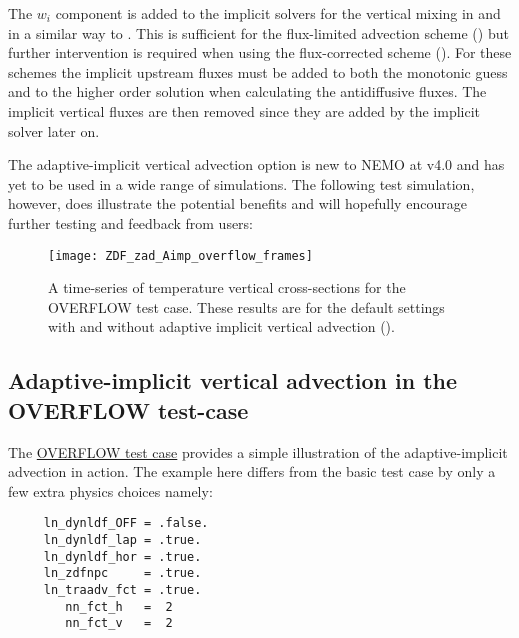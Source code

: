 \documentclass[../main/NEMO_manual]{subfiles}
\begin{document}
The $w_i$ component is added to the implicit solvers for the vertical mixing in
 and  in a similar way to \citep{shchepetkin_OM15}.  This is
sufficient for the flux-limited advection scheme () but further
intervention is required when using the flux-corrected scheme ().
For these schemes the implicit upstream fluxes must be added to both the monotonic guess
and to the higher order solution when calculating the antidiffusive fluxes. The implicit
vertical fluxes are then removed since they are added by the implicit solver later on.

The adaptive-implicit vertical advection option is new to NEMO at v4.0 and has yet to be
used in a wide range of simulations. The following test simulation, however, does illustrate
the potential benefits and will hopefully encourage further testing and feedback from users:

\begin{figure}[!t]
  \centering
  \texttt{[image: ZDF\_zad\_Aimp\_overflow\_frames]}
  \caption[OVERFLOW: time-series of temperature vertical cross-sections]{
    A time-series of temperature vertical cross-sections for the OVERFLOW test case.
    These results are for the default settings with  and
    without adaptive implicit vertical advection ().}
  \label{fig:ZDF_zad_Aimp_overflow_frames}
\end{figure}

\subsection{Adaptive-implicit vertical advection in the OVERFLOW test-case}

The \href{https://forge.ipsl.jussieu.fr/nemo/chrome/site/doc/NEMO/guide/html/test\_cases.html\#overflow}{OVERFLOW test case}
provides a simple illustration of the adaptive-implicit advection in action. The example here differs from the basic test case
by only a few extra physics choices namely:

\begin{verbatim}
     ln_dynldf_OFF = .false.
     ln_dynldf_lap = .true.
     ln_dynldf_hor = .true.
     ln_zdfnpc     = .true.
     ln_traadv_fct = .true.
        nn_fct_h   =  2
        nn_fct_v   =  2
\end{verbatim}
\end{document}
